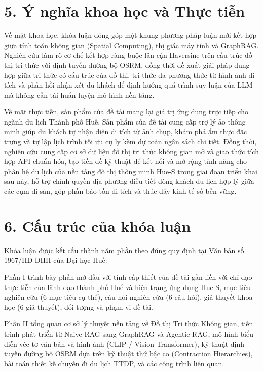 \section*{5. Ý nghĩa khoa học và Thực tiễn}
{}

Về mặt khoa học, khóa luận đóng góp một khung phương pháp luận mới kết hợp giữa tính toán không gian (Spatial Computing), thị giác máy tính và GraphRAG. Nghiên cứu làm rõ cơ chế kết hợp ràng buộc lân cận Haversine trên cấu trúc đồ thị tri thức với định tuyến đường bộ OSRM, đồng thời đề xuất giải pháp dung hợp giữa tri thức có cấu trúc của đồ thị, tri thức đa phương thức từ hình ảnh di tích và phản hồi nhận xét du khách để định hướng quá trình suy luận của LLM mà không cần tái huấn luyện mô hình nền tảng.

Về mặt thực tiễn, sản phẩm của đề tài mang lại giá trị ứng dụng trực tiếp cho ngành du lịch Thành phố Huế. Sản phẩm của đề tài cung cấp trợ lý ảo thông minh giúp du khách tự nhận diện di tích từ ảnh chụp, khám phá ẩm thực đặc trưng và tự lập lịch trình tối ưu cự ly kèm dự toán ngân sách chi tiết. Đồng thời, nghiên cứu cung cấp cơ sở dữ liệu đồ thị tri thức không gian mở và giao thức tích hợp API chuẩn hóa, tạo tiền đề kỹ thuật để kết nối và mở rộng tính năng cho phân hệ du lịch của nền tảng đô thị thông minh Hue-S trong giai đoạn triển khai sau này, hỗ trợ chính quyền địa phương điều tiết dòng khách du lịch hợp lý giữa các cụm di sản, góp phần bảo tồn di tích và thúc đẩy kinh tế số bền vững.

\section*{6. Cấu trúc của khóa luận}
{}

Khóa luận được kết cấu thành năm phần theo đúng quy định tại Văn bản số 1967/\allowbreak HD-ĐHH của Đại học Huế:

Phần I trình bày phần mở đầu với tính cấp thiết của đề tài gắn liền với chỉ đạo thực tiễn của lãnh đạo thành phố Huế và hiện trạng ứng dụng Hue-S, mục tiêu nghiên cứu (6 mục tiêu cụ thể), câu hỏi nghiên cứu (6 câu hỏi), giả thuyết khoa học (6 giả thuyết), đối tượng và phạm vi đề tài.

Phần II tổng quan cơ sở lý thuyết nền tảng về Đồ thị Tri thức Không gian, tiến trình phát triển từ Naive RAG sang GraphRAG và Agentic RAG, mô hình biểu diễn véc-tơ văn bản và hình ảnh (CLIP / Vision Transformer), kỹ thuật định tuyến đường bộ OSRM dựa trên kỹ thuật thứ bậc co (Contraction Hierarchies), bài toán thiết kế chuyến đi du lịch TTDP, và các công trình liên quan.

